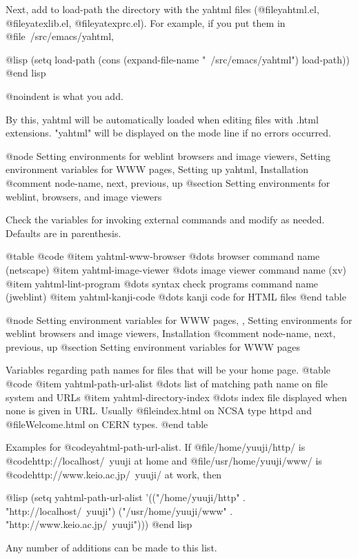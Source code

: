Next, add to load-path the directory with the yahtml files
(@file{yahtml.el}, @file{yatexlib.el}, @file{yatexprc.el}).  For example,
if you put them in @file{~/src/emacs/yahtml},

@lisp
(setq load-path (cons (expand-file-name "~/src/emacs/yahtml") load-path))
@end lisp

@noindent
is what you add.

By this, yahtml will be automatically loaded when editing files with .html
extensions.  "yahtml" will be displayed on the mode line if no errors
occurred.

@node Setting environments for weblint browsers and image viewers, Setting environment variables for WWW pages, Setting up yahtml, Installation
@comment  node-name,  next,  previous,  up
@section Setting environments for weblint, browsers, and image viewers

Check the variables for invoking external commands and modify as needed.
Defaults are in parenthesis.

@table @code
@item yahtml-www-browser
        @dots{} browser command name (netscape)
@item yahtml-image-viewer
        @dots{} image viewer command name (xv)
@item yahtml-lint-program
        @dots{} syntax check programs command name (jweblint)
@item yahtml-kanji-code
        @dots{} kanji code for HTML files
@end table

@node Setting environment variables for WWW pages,  , Setting environments for weblint browsers and image viewers, Installation
@comment  node-name,  next,  previous,  up
@section Setting environment variables for WWW pages

Variables regarding path names for files that will be your home page.
@table @code
@item yahtml-path-url-alist
        @dots{} list of matching path name on file system and URLs
@item yahtml-directory-index
        @dots{} index file displayed when none is given in URL.  Usually
        @file{index.html} on NCSA type httpd and @file{Welcome.html} on
        CERN types.
@end table

Examples for  @code{yahtml-path-url-alist}.  If @file{/home/yuuji/http/}
is @code{http://localhost/~yuuji} at home and @file{/usr/home/yuuji/www/}
is @code{http://www.keio.ac.jp/~yuuji/} at work, then

@lisp
(setq yahtml-path-url-alist
      '(("/home/yuuji/http" . "http://localhost/~yuuji")
        ("/usr/home/yuuji/www" . "http://www.keio.ac.jp/~yuuji")))
@end lisp

Any number of additions can be made to this list.

